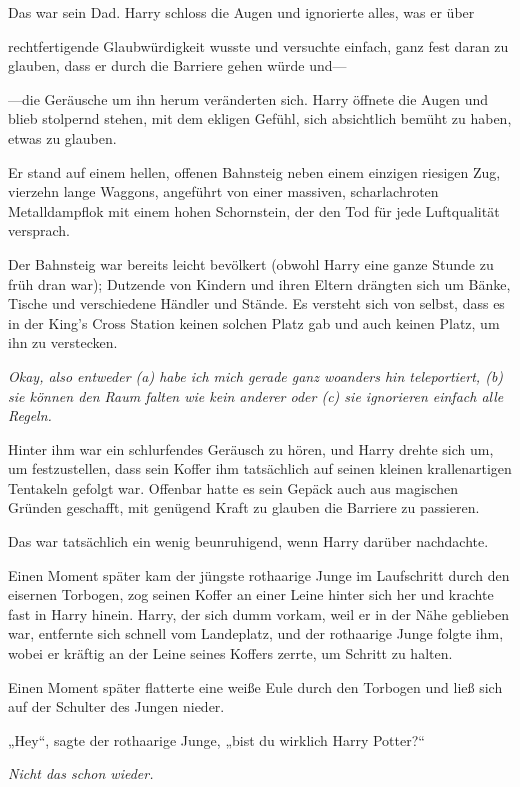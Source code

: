 {Das war sein Dad. Harry schloss die Augen und ignorierte alles, was er über

rechtfertigende Glaubwürdigkeit wusste und versuchte einfach, ganz fest daran zu glauben, dass er durch die Barriere gehen würde und—

—die Geräusche um ihn herum veränderten sich. Harry öffnete die Augen und blieb stolpernd stehen, mit dem ekligen Gefühl, sich absichtlich bemüht zu haben, etwas zu glauben.

Er stand auf einem hellen, offenen Bahnsteig neben einem einzigen riesigen Zug, vierzehn lange Waggons, angeführt von einer massiven, scharlachroten Metalldampflok mit einem hohen Schornstein, der den Tod für jede Luftqualität versprach.

Der Bahnsteig war bereits leicht bevölkert (obwohl Harry eine ganze Stunde zu früh dran war); Dutzende von Kindern und ihren Eltern drängten sich um Bänke, Tische und verschiedene Händler und Stände. Es versteht sich von selbst, dass es in der King's Cross Station keinen solchen Platz gab und auch keinen Platz, um ihn zu verstecken.

\emph{Okay, also entweder (a) habe ich mich gerade ganz woanders hin teleportiert, (b) sie können den Raum falten wie kein anderer oder (c) sie ignorieren einfach alle Regeln.}

Hinter ihm war ein schlurfendes Geräusch zu hören, und Harry drehte sich um, um festzustellen, dass sein Koffer ihm tatsächlich auf seinen kleinen krallenartigen Tentakeln gefolgt war. Offenbar hatte es sein Gepäck auch aus magischen Gründen geschafft, mit genügend Kraft zu glauben die Barriere zu passieren.

Das war tatsächlich ein wenig beunruhigend, wenn Harry darüber nachdachte.

Einen Moment später kam der jüngste rothaarige Junge im Laufschritt durch den eisernen Torbogen, zog seinen Koffer an einer Leine hinter sich her und krachte fast in Harry hinein. Harry, der sich dumm vorkam, weil er in der Nähe geblieben war, entfernte sich schnell vom Landeplatz, und der rothaarige Junge folgte ihm, wobei er kräftig an der Leine seines Koffers zerrte, um Schritt zu halten.

Einen Moment später flatterte eine weiße Eule durch den Torbogen und ließ sich auf der Schulter des Jungen nieder.

„Hey“, sagte der rothaarige Junge, „bist du wirklich Harry Potter?“

\emph{Nicht das schon wieder.}

}
